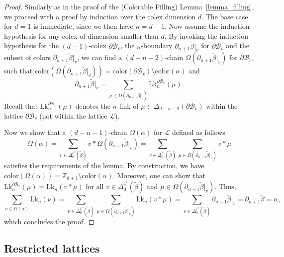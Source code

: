 \documentclass[onecolumn,letterpaper,11pt,accepted=2022-12-19]{quantumarticle}
\newcommand{\face}[2]{{\Delta_{#1}(#2)}}
\newcommand{\facex}[3]{{\Delta^{#1}_{#2}(#3)}}
\newcommand{\link}[2]{{\mathrm{Lk}_{#1}(#2)}}
\newcommand{\linkx}[3]{{\mathrm{Lk}^{#1}_{#2}(#3)}}
\newcommand{\rest}[1]{|_{#1}}
\newcommand{\col}[1]{{\mathrm{color}(#1)}}
\theoremstyle{definition}
\theoremstyle{lemma}
\theoremstyle{theorem}
\theoremstyle{corollary}
\begin{document}
{\begin{proof}
Similarly as in the proof of the (Colorable Filling) Lemma~\ref{lemma_filling}, we proceed with a proof by induction over the colex dimension $d$.
The base case for $d=1$ is immediate, since we then have $n=d-1$.
Now assume the induction hypothesis for any colex of dimension smaller than $d$.
By invoking the induction hypothesis for the $(d-1)$-colex $\partial \mathcal{B}_v$, the $n$-boundary $\partial_{n+1} \widetilde\beta\rest v$ for $\partial \mathcal{B}_v$ and the subset of colors $\partial_{n+1} \widetilde\beta\rest v$, we can find a $(d-n-2)$-chain $\Omega(\partial_{n+1} \widetilde\beta\rest v)$ for $\partial\mathcal{B}_v$, such that 
$\col{\Omega(\partial_{n+1} \widetilde\beta\rest v)} = \col{\partial\mathcal{B}_v} \setminus \col\alpha$ and
\begin{equation}
\partial_{n+1} \widetilde\beta\rest v = \sum_{\mu\in\Omega(\partial_{n+1} \widetilde\beta\rest v)} \linkx {\partial\mathcal{B}_v} n \mu.
\end{equation}
Recall that $\linkx {\partial\mathcal{B}_v} n \mu$ denotes the $n$-link of $\mu\in\face {d-n-2}{\partial\mathcal{B}_v}$ within the lattice $\partial\mathcal{B}_v$ (not within the lattice $\mathcal{L}$).

Now we show that a $(d-n-1)$-chain $\Omega(\alpha)$ for $\mathcal{L}$ defined as follows
\begin{equation}
\Omega(\alpha) = \sum_{v \in \facex {c^*} 0 {\widetilde\beta}} v* \Omega(\partial_{n+1} \widetilde\beta\rest v)
= \sum_{v \in \facex {c^*} 0 {\widetilde\beta}} \sum_{\mu \in \Omega(\partial_{n+1} \widetilde\beta\rest v)} v * \mu
\end{equation}
satisfies the requirements of the lemma.
By construction, we have $\col{\Omega(\alpha)} = \mathbb{Z}_{d+1} \setminus \col\alpha$.
Moreover, one can show that $\linkx {\partial\mathcal{B}_v} n \mu = \link n {v * \mu}$ for all $v\in \facex {c^*} 0 {\widetilde\beta}$ and $\mu\in\Omega(\partial_{n+1}\widetilde\beta\rest v)$. Thus,
\begin{equation}
\sum_{\nu \in \Omega(\alpha)} \link n \nu
= \sum_{v \in \facex {c^*} 0 {\widetilde\beta}} \sum_{\mu \in \Omega(\partial_{n+1} \widetilde\beta\rest v)} \link n {v * \mu}
= \sum_{v \in \facex {c^*} 0 {\widetilde\beta}} \partial_{n+1} \widetilde\beta\rest v = \partial_{n+1} \widetilde\beta = \alpha,
\end{equation}
which concludes the proof.
\end{proof}




\subsection{Restricted lattices}
\label{sec_restricted_lattice}



}
\end{document}

